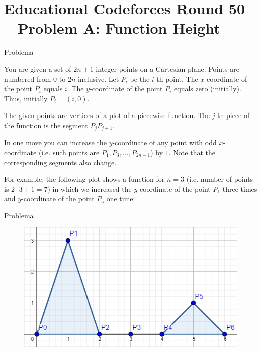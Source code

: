 \section{Educational Codeforces Round 50 -- Problem A: Function Height}

\begin{frame}[fragile]{Problema}

You are given a set of $2n+1$ integer points on a Cartesian plane. Points are numbered from $0$ to 
$2n$ inclusive. Let $P_i$ be the $i$-th point. The $x$-coordinate of the point $P_i$ equals $i$. 
The $y$-coordinate of the point $P_i$ equals zero (initially). Thus, initially $P_i=(i,0)$.

The given points are vertices of a plot of a piecewise function. The $j$-th piece of the function 
is the segment $P_jP_{j+1}$.

In one move you can increase the $y$-coordinate of any point with odd $x$-coordinate (i.e. such points are $P_1, P_3, \ldots, P_{2n-1}$) by $1$. Note that the corresponding segments also change.

For example, the following plot shows a function for $n=3$ (i.e. number of points is $2\cdot 3+1=7$) in which we increased the $y$-coordinate of the point $P_1$ three times and $y$-coordinate of the point $P_5$ one time:

\end{frame}

\begin{frame}[fragile]{Problema}
    \begin{figure}
        \centering
        \includegraphics[scale=0.6]{figure.png}
    \end{figure}
\end{frame}

